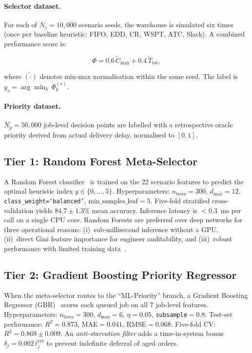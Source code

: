 \documentclass[3p,times]{elsarticle}
\begin{document}
\paragraph{Selector dataset.}
For each of $N_{s}=10{,}000$ scenario seeds, the warehouse is
simulated six times (once per baseline heuristic: FIFO, EDD, CR,
WSPT, ATC, Slack).  A combined performance score is:

\begin{equation}
  \Phi = 0.6\,\widetilde{C}_{\max}
        + 0.4\,\widetilde{T}_{\mathrm{tot}},
  \label{eq:score}
\end{equation}

\noindent where $\widetilde{(\cdot)}$ denotes min-max
normalisation within the same seed.  The label is
$y_s = \arg\min_{k}\,\Phi_{k}^{(s)}$.

\paragraph{Priority dataset.}
$N_{p}=50{,}000$ job-level decision points are labelled with a
retrospective oracle priority derived from actual delivery delay,
normalised to $[0,1]$.

\subsection{Tier 1: Random Forest Meta-Selector}
\label{sec:rf}

A Random Forest classifier~\cite{Breiman2001} is trained on the
22 scenario features to predict the optimal heuristic index
$y\in\{0,\ldots,5\}$.
Hyperparameters: $n_{\text{trees}}=300$, $d_{\max}=12$,
\texttt{class\_weight=\allowbreak`balanced'},
$\text{min\_samples\_leaf}=5$.
Five-fold stratified cross-validation yields
$84.7\pm1.3\%$ mean accuracy.
Inference latency is $<0.3$~ms per call on a single CPU core.
Random Forests are preferred over deep networks for three
operational reasons: (i)~sub-millisecond inference without a GPU,
(ii)~direct Gini feature importance for engineer auditability, and
(iii)~robust performance with limited training data~\cite{Breiman2001}.

\subsection{Tier 2: Gradient Boosting Priority Regressor}
\label{sec:gbr}

When the meta-selector routes to the ``ML-Priority'' branch, a
Gradient Boosting Regressor (GBR)~\cite{Friedman2001} scores each
queued job on all 7 job-level features.
Hyperparameters: $n_{\text{trees}}=300$, $d_{\max}=6$,
$\eta=0.05$, \texttt{subsample}$=0.8$.
Test-set performance: $R^{2}=0.873$, MAE$=0.041$,
RMSE$=0.068$.
Five-fold CV: $R^{2}=0.869\pm0.009$.
An \textit{anti-starvation filter} adds a time-in-system bonus
$\delta_j = 0.002\,t_{j}^{\mathrm{sys}}$ to prevent indefinite
deferral of aged orders.
\end{document}
